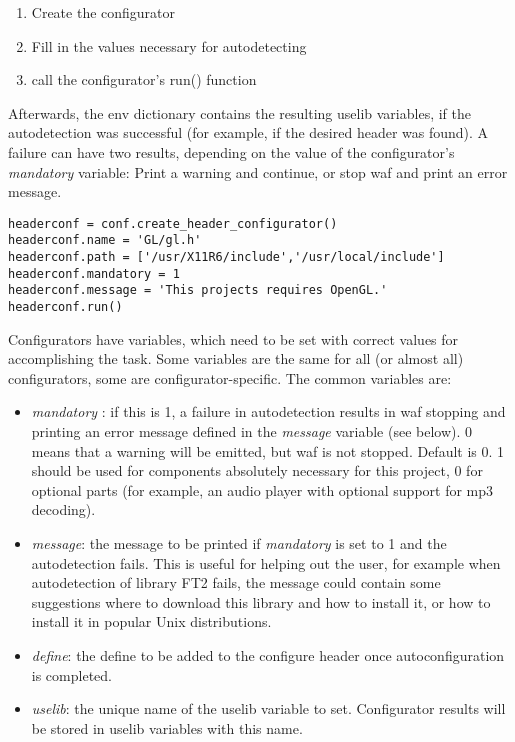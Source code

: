 \documentclass[a4paper,10pt]{article}
\begin{document}
\begin{enumerate}
	\item Create the configurator
	\item Fill in the values necessary for autodetecting
	\item call the configurator's run() function
\end{enumerate}
Afterwards, the env dictionary contains the resulting uselib variables, if the autodetection was successful
(for example, if the desired header was found). A failure can have two results,
depending on the value of the configurator's \emph{mandatory} variable: Print a warning and continue, or stop waf and print an error message.
\begin{center}
	\begin{lstlisting}[caption=\footnotesize Example header configurator usage]
headerconf = conf.create_header_configurator()
headerconf.name = 'GL/gl.h'
headerconf.path = ['/usr/X11R6/include','/usr/local/include']
headerconf.mandatory = 1
headerconf.message = 'This projects requires OpenGL.'
headerconf.run()
	\end{lstlisting}
\end{center}
Configurators have variables, which need to be set with correct values for accomplishing the task.
Some variables are the same for all (or almost all) configurators, some are configurator-specific. The common variables are:

\begin{itemize}
	\item \emph{mandatory} : if this is 1, a failure in autodetection results in waf stopping and printing an error message defined in the
	\emph{message} variable (see below). 0 means that a warning will be emitted, but waf is not stopped. Default is 0. 1 should be used for components absolutely necessary for this project, 0 for optional parts (for example, an audio player with optional support for mp3 decoding).
	\item \emph{message}: the message to be printed if \emph{mandatory} is set to 1 and the autodetection fails. This is useful for
	helping out the user, for example when autodetection of library FT2 fails, the message could contain some suggestions where to download this library and how to install it, or how to install it in popular Unix distributions.
	\item \emph{define}: the define to be added to the configure header once autoconfiguration is completed.
	\item \emph{uselib}: the unique name of the uselib variable to set. Configurator results will be stored in uselib variables with this name.
\end{itemize}
\end{document}
